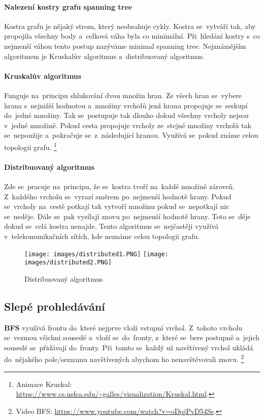 \paragraph{Nalezení kostry grafu spanning tree} Kostra grafu je nějaký strom, který neobsahuje cykly. Kostra se~vytváří tak, aby propojila všechny body a~celková váha byla co minimální. Při~hledání kostry s~co nejmenší váhou tento postup nazýváme minimal spanning tree. Nejznámějším algoritmem je Kruskalův algoritmus a~distribuovaný algoritmus.

\paragraph{Kruskalův algoritmus} Funguje na~principu shlukování dvou množin hran. Ze všech hran se~vybere hrana s~nejnižší hodnotou a~množiny vrcholů jenž hrana propojuje se~seskupí do~jedné množiny. Tak se~postupuje tak dlouho dokud všechny vrcholy nejsou v~jedné množině. Pokud cesta propojuje vrcholy ze~stejné množiny vrcholů tak se~nepoužije a~pokračuje se~z~následující hranou. Využívá se~pokud známe celou topologii grafu.%
\footnote{Animace Kruskal: \url{https://www.cs.usfca.edu/~galles/visualization/Kruskal.html}.}

\paragraph{Distribuovaný algoritmus} Zde se~pracuje na~principu, že se~kostra tvoří na~každé množině zároveň. Z~každého vrcholu se~vyrazí směrem po~nejmenší hodnotě hrany. Pokud se~vrcholy na~cestě potkají tak vytvoří množinu pokud se~nepotkají nic se~neděje. Dále se~pak vysílají znovu po~nejmenší hodnotě hrany. Toto se~děje dokud se~celá kostra nenajde. Tento algoritmus se~nejčastěji využívá v~telekomunikačních sítích, kde neznáme celou topologii grafu.

\begin{figure}[ht]
	\centering
	\texttt{[image: images/distributed1.PNG]}
	\texttt{[image: images/distributed2.PNG]}
	\caption{Distribuovaný algoritmus}
	\label{distributed}
\end{figure}

\subsection{Slepé prohledávání}

\textbf{BFS} využívá frontu do~které nejprve vloží vstupní vrchol. Z~tohoto vrcholu se~vezmou všichni sousedé a~vloží se~do~fronty, z~které se~bere postupně a~jejich sousedé se~přidávají do~fronty. Při~tomto se~každý už navštívený vrchol ukládá do~nějakého pole/seznamu navštívených abychom ho nenavštěvovali znovu.%
\footnote{Video BFS: \url{https://www.youtube.com/watch?v=oDqjPvD54Ss}.}


